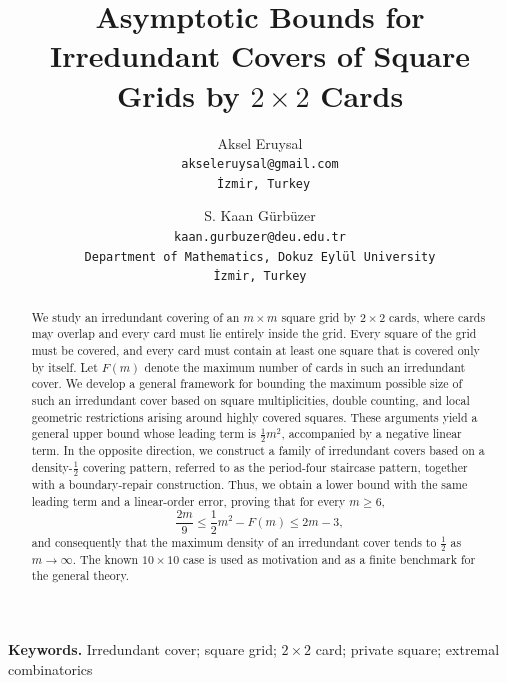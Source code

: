 \documentclass[11pt]{article}
\title{Asymptotic Bounds for Irredundant Covers of Square Grids by \(2\times2\) Cards}
\author{ Aksel Eruysal\\
	\texttt{akseleruysal@gmail.com}\\
	\texttt{ İzmir, Turkey}
	\and 
	S. Kaan G\"{u}rb\"{u}zer\\
	\texttt{kaan.gurbuzer@deu.edu.tr}\\
	\texttt{Department of Mathematics, Dokuz Eyl\"{u}l University \\ 
		İzmir, Turkey}
}
\date{}
\begin{document}
	
	\maketitle
	
	\begin{abstract}
		
		
		We study an irredundant covering of an $m \times m$ square grid by $2 \times 2$ cards, where cards may overlap and every card must lie entirely inside the grid. Every square of the grid must be covered, and every card must contain at least one square that is covered only by itself. Let \(F(m)\) denote the maximum number of cards in such an irredundant cover. We develop a general framework for bounding the maximum possible size of such an irredundant cover based on square multiplicities, double counting, and local geometric restrictions arising around highly covered squares. These arguments yield a general upper bound whose leading term is $\frac{1}{2}m^2$, accompanied by a negative linear term. In the opposite direction, we construct a family of irredundant covers based on a density-$\frac{1}{2}$ covering pattern, referred to as the period-four staircase pattern, together with a boundary-repair construction. Thus, we obtain a lower bound with the same leading term and a linear-order error, proving that for every \(m\ge6\),
		\[
		\frac{2m}{9}
		\le
		\frac12m^2-F(m)
		\le
		2m-3,
		\]
		and consequently that the maximum density of an irredundant cover tends to $\frac{1}{2}$ as $m\to\infty$. The known $10\times 10$ case is used as motivation and as a finite benchmark for the general theory.
		
		
		
	\end{abstract}
	\noindent\textbf{Keywords.}
	Irredundant cover; square grid; \(2\times2\) card; private square; extremal
	combinatorics
	
\end{document}
